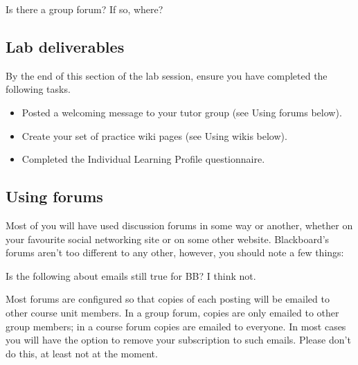 \begin{firstonly}
\begin{itemize}
\begin{note}
Is there a group forum? If so, where?    
\end{note}



 
\end{itemize}


\subsection{Lab deliverables}
\label{sec:lab-deliverables}

By the end of this section of the lab session, ensure you have completed the following tasks.

\begin{itemize}
\item
Posted a welcoming message to your tutor group (see Using forums below).

\item Create your set of practice wiki pages (see Using wikis below).

\item Completed the Individual Learning Profile questionnaire.
\end{itemize}


\subsection{Using forums}
\label{sec:using-forums}


Most of you will have used discussion forums in some way or another, whether on your favourite social networking site or on some other website. Blackboard's forums aren't too different to any other, however, you should note a few things:

\begin{note}
  Is the following about emails still true for BB? I think not.
\end{note}
Most forums are configured so that copies of each posting will be emailed to other course unit members. In a group forum, copies are only emailed to other group members; in a course forum copies are emailed to everyone.
In most cases you will have the option to remove your subscription to such emails. Please don't do this, at least not at the moment.


\end{firstonly}
